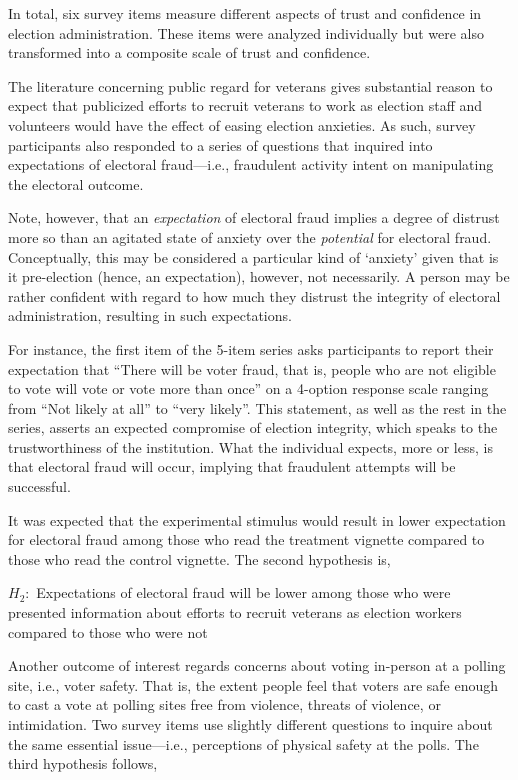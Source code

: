 \documentclass[
  11pt,
  a4paper,
]{scrartcl}
\begin{document}
In total, six survey items measure different aspects of trust and
confidence in election administration. These items were analyzed
individually but were also transformed into a composite scale of trust
and confidence.

The literature concerning public regard for veterans gives substantial
reason to expect that publicized efforts to recruit veterans to work as
election staff and volunteers would have the effect of easing election
anxieties. As such, survey participants also responded to a series of
questions that inquired into expectations of electoral fraud---i.e.,
fraudulent activity intent on manipulating the electoral outcome.

Note, however, that an \emph{expectation} of electoral fraud implies a
degree of distrust more so than an agitated state of anxiety over the
\emph{potential} for electoral fraud. Conceptually, this may be
considered a particular kind of `anxiety' given that is it pre-election
(hence, an expectation), however, not necessarily. A person may be
rather confident with regard to how much they distrust the integrity of
electoral administration, resulting in such expectations.

For instance, the first item of the 5-item series asks participants to
report their expectation that ``There will be voter fraud, that is,
people who are not eligible to vote will vote or vote more than once''
on a 4-option response scale ranging from ``Not likely at all'' to
``very likely''. This statement, as well as the rest in the series,
asserts an expected compromise of election integrity, which speaks to
the trustworthiness of the institution. What the individual expects,
more or less, is that electoral fraud will occur, implying that
fraudulent attempts will be successful.

It was expected that the experimental stimulus would result in lower
expectation for electoral fraud among those who read the treatment
vignette compared to those who read the control vignette. The second
hypothesis is,

\(H_{2}:\) Expectations of electoral fraud will be lower among those who
were presented information about efforts to recruit veterans as election
workers compared to those who were not

Another outcome of interest regards concerns about voting in-person at a
polling site, i.e., voter safety. That is, the extent people feel that
voters are safe enough to cast a vote at polling sites free from
violence, threats of violence, or intimidation. Two survey items use
slightly different questions to inquire about the same essential
issue---i.e., perceptions of physical safety at the polls. The third
hypothesis follows,
\end{document}

